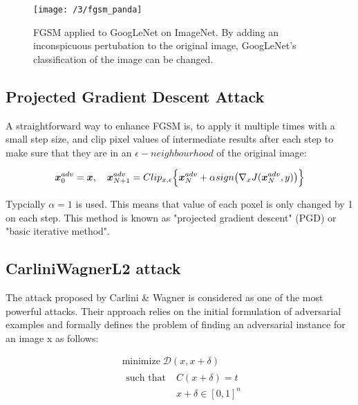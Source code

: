 \begin{figure}
	\centering
	\texttt{[image: /3/fgsm\_panda]}
    \caption{FGSM applied to GoogLeNet \cite{szegedy2015going} on ImageNet. By
    adding an inconspicuous pertubation to the original image, GoogLeNet's
    classification of the image can be changed.} 
	\label{fig:fgsm_panda}
\end{figure}

\subsection{Projected Gradient Descent Attack}
A straightforward way to enhance FGSM is, to apply it multiple times with a
small step size, and clip pixel values of intermediate results after each step
to make sure that they are in an $\epsilon-neighbourhood$  of the original
image:


\begin{equation}\label{eq:fgsm}
    \boldsymbol{x}^{adv}_{0} = \boldsymbol{x}, \quad \boldsymbol{x}^{adv}_{N + 1}=Clip_{x, \epsilon} \Big \{\boldsymbol{x}^{adv}_{N} + \alpha sign\big(\nabla_{x}J(\boldsymbol{x}^{adv}_{N}, y)\big)  \Big\}
\end{equation}

Typcially $\alpha = 1$ is used. This means that value of each poxel is only
changed by 1 on each step. This method is known as "projected gradient descent"
(PGD) or "basic iterative method". \cite{kurakin2016adversarial, madry2017towards}

\subsection{CarliniWagnerL2 attack}
The attack proposed by Carlini \& Wagner \cite{carlini2017towards} is considered
as one of the most powerful attacks. Their approach relies on the initial
formulation of adversarial examples \cite{szegedy2013intriguing} and formally 
defines the problem of finding an adversarial instance for an image x as follows:

\begin{align}
    & \text{minimize} \; \mathcal{D}(x, x + \delta) \\
    & \begin{aligned}
        \text{such that}  \;    & C(x + \delta) = t \\
                                & x + \delta \in [0, 1]^n 
    \end{aligned}
\end{align} 

